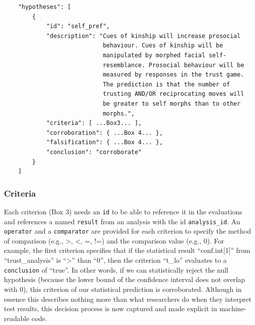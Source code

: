 \documentclass[
  english,
  doc,floatsintext]{apa6}
\begin{document}
\begin{tcolorbox}[colback=black!5!white,colframe=white!5!black,title=Box 2. The hypothesis component.]
\begin{verbatim}
    "hypotheses": [
        {
            "id": "self_pref",
            "description": "Cues of kinship will increase prosocial
                            behaviour. Cues of kinship will be
                            manipulated by morphed facial self-
                            resemblance. Prosocial behaviour will be
                            measured by responses in the trust game.
                            The prediction is that the number of
                            trusting AND/OR reciprocating moves will 
                            be greater to self morphs than to other
                            morphs.",
            "criteria": [ ...Box3... ],
            "corroboration": { ...Box 4... },
            "falsification": { ...Box 4... },
            "conclusion": "corroborate"
        }
    ]
\end{verbatim}
\end{tcolorbox}

\hypertarget{criteria}{%
\subsubsection{Criteria}\label{criteria}}

Each criterion (Box 3) needs an \texttt{id} to be able to reference it in the evaluations and references a named \texttt{result} from an analysis with the id \texttt{analysis\_id}. An \texttt{operator} and a \texttt{comparator} are provided for each criterion to specify the method of comparison (e.g., \textgreater, \textless, =, !=) and the comparison value (e.g., 0). For example, the first criterion specifies that if the statistical result \enquote{conf.int{[}1{]}} from \enquote{trust\_analysis} is \enquote{\textgreater{}} than \enquote{0}, then the criterion \enquote{t\_lo} evaluates to a \texttt{conclusion} of \enquote{true}. In other words, if we can statistically reject the null hypothesis (because the lower bound of the confidence interval does not overlap with 0), this criterion of our statistical prediction is corroborated. Although in essence this describes nothing more than what researchers do when they interpret test results, this decision process is now captured and made explicit in machine-readable code.
\end{document}

